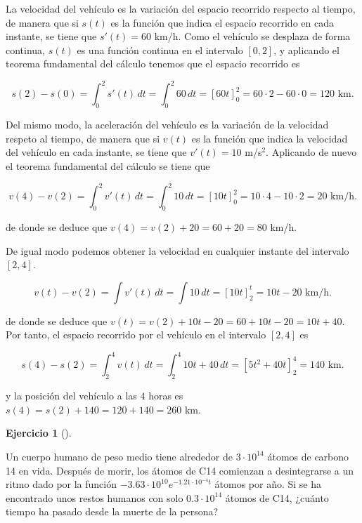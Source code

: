 \documentclass[
  a4paper,
]{scrreport}
\theoremstyle{definition}
\newtheorem{exercise}{Ejercicio}[chapter]
\theoremstyle{remark}
\begin{document}
\begin{tcolorbox}[enhanced jigsaw, coltitle=black, toptitle=1mm, colframe=quarto-callout-tip-color-frame, colbacktitle=quarto-callout-tip-color!10!white, breakable, opacityback=0, bottomtitle=1mm, opacitybacktitle=0.6, title=\textcolor{quarto-callout-tip-color}{\faLightbulb}\hspace{0.5em}{Solución}, arc=.35mm, leftrule=.75mm, toprule=.15mm, titlerule=0mm, bottomrule=.15mm, left=2mm, rightrule=.15mm, colback=white]

La velocidad del vehículo es la variación del espacio recorrido respecto
al tiempo, de manera que si \(s(t)\) es la función que indica el espacio
recorrido en cada instante, se tiene que \(s'(t)=60\) km/h. Como el
vehículo se desplaza de forma continua, \(s(t)\) es una función continua
en el intervalo \([0,2]\), y aplicando el teorema fundamental del
cálculo tenemos que el espacio recorrido es

\[
s(2) - s(0) 
= \int_0^2 s'(t)\,dt 
= \int_0^2 60\,dt 
= [60t]_0^2
= 60\cdot 2 - 60\cdot 0
= 120\text{ km}.
\]

Del mismo modo, la aceleración del vehículo es la variación de la
velocidad respeto al tiempo, de manera que si \(v(t)\) es la función que
indica la velocidad del vehículo en cada instante, se tiene que
\(v'(t)=10\) m/s\(^2\). Aplicando de nuevo el teorema fundamental del
cálculo se tiene que

\[
v(4) - v(2) 
= \int_0^2 v'(t)\,dt
= \int_0^2 10\,dt
= [10t]_0^2
= 10\cdot 4 - 10\cdot 2
= 20\text{ km/h}.
\]

de donde se deduce que \(v(4) = v(2) + 20 = 60 + 20 = 80\) km/h.

De igual modo podemos obtener la velocidad en cualquier instante del
intervalo \([2,4]\).

\[
v(t) - v(2)
= \int v'(t)\,dt 
= \int 10\,dt 
= [10t]_2^t
= 10t - 20\text{ km/h}.
\]

de donde se deduce que
\(v(t) = v(2) + 10t - 20 = 60 + 10t -20 = 10t+40\). Por tanto, el
espacio recorrido por el vehículo en el intervalo \([2,4]\) es

\[
s(4) - s(2)
= \int_2^4 v(t)\,dt
= \int_2^4 10t + 40\,dt
= [5t^2 + 40t]_2^4
= 140 \text{ km}.
\]

y la posición del vehículo a las \(4\) horas es
\(s(4) = s(2) + 140 = 120 + 140 = 260\) km.

\end{tcolorbox}

\begin{exercise}[]\protect\hypertarget{exr-desintegracion-radioactiva}{}\label{exr-desintegracion-radioactiva}

Un cuerpo humano de peso medio tiene alrededor de \(3\cdot 10^{14}\)
átomos de carbono 14 en vida. Después de morir, los átomos de C14
comienzan a desintegrarse a un ritmo dado por la función
\(-3.63\cdot 10^{10}e^{-1.21\cdot 10^{-4}t}\) átomos por año. Si se ha
encontrado unos restos humanos con solo \(0.3\cdot 10^{14}\) átomos de
C14, ¿cuánto tiempo ha pasado desde la muerte de la persona?

\end{exercise}
\end{document}
